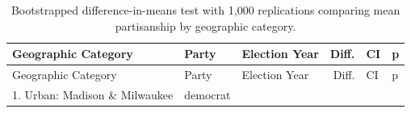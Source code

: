 \documentclass[10pt,]{article}
\begin{document}
\begin{longtable}[]{@{}lllrll@{}}
\caption{Bootstrapped difference-in-means test with 1,000 replications
comparing mean partisanship by geographic category.}\tabularnewline
\toprule
\begin{minipage}[b]{0.29\columnwidth}\raggedright
Geographic Category\strut
\end{minipage} & \begin{minipage}[b]{0.09\columnwidth}\raggedright
Party\strut
\end{minipage} & \begin{minipage}[b]{0.18\columnwidth}\raggedright
Election Year\strut
\end{minipage} & \begin{minipage}[b]{0.07\columnwidth}\raggedleft
Diff.\strut
\end{minipage} & \begin{minipage}[b]{0.14\columnwidth}\raggedright
CI\strut
\end{minipage} & \begin{minipage}[b]{0.05\columnwidth}\raggedright
p\strut
\end{minipage}\tabularnewline
\midrule
\endfirsthead
\toprule
\begin{minipage}[b]{0.29\columnwidth}\raggedright
Geographic Category\strut
\end{minipage} & \begin{minipage}[b]{0.09\columnwidth}\raggedright
Party\strut
\end{minipage} & \begin{minipage}[b]{0.18\columnwidth}\raggedright
Election Year\strut
\end{minipage} & \begin{minipage}[b]{0.07\columnwidth}\raggedleft
Diff.\strut
\end{minipage} & \begin{minipage}[b]{0.14\columnwidth}\raggedright
CI\strut
\end{minipage} & \begin{minipage}[b]{0.05\columnwidth}\raggedright
p\strut
\end{minipage}\tabularnewline
\midrule
\endhead
\begin{minipage}[t]{0.29\columnwidth}\raggedright
1. Urban: Madison \& Milwaukee\strut
\end{minipage} & \begin{minipage}[t]{0.09\columnwidth}\raggedright
democrat\strut
\end{minipage} & \begin{minipage}[t]{0.18\columnwidth}\raggedright

\end{minipage}
\end{longtable}
\end{document}
